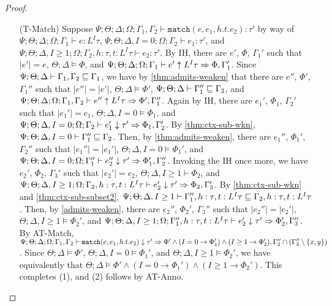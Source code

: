 \begin{proof}
\begin{itemize}
  
  \item[(T-Match)] Suppose
  $\Psi ; \Theta ; \Delta ; \Omega ; \Gamma_1,\Gamma_2\vdash \texttt{match}(e,e_1,h.t.e_2) : \tau'$ by way of
  $\Psi ; \Theta ; \Delta ; \Omega ; \Gamma_1\vdash e : L^I \tau$,
  $\Psi ; \Theta ; \Delta, I = 0 ; \Omega ; \Gamma_2\vdash e_1 : \tau'$, and
  $\Psi ; \Theta ; \Delta, I \geq 1; \Omega ; \Gamma_2, h : \tau, t : L^I \tau \vdash e_2 : \tau'$.
  By IH, there are $e'$, $\Phi$, $\Gamma_1'$ such that
  $|e'| = e$,
  $\Theta ; \Delta \vDash \Phi$, and
  $\Psi ; \Theta ; \Delta ; \Omega ; \Gamma_1 \vdash e' \uparrow L^I \tau \Rightarrow \Phi, \Gamma_1'$.
  Since $\Psi ; \Theta ; \Delta \vdash \Gamma_1,\Gamma_2 \sqsubseteq \Gamma_1$,
  we have by \autoref{thm:admits-weaken} that there are $e''$, $\Phi'$, $\Gamma_1''$ such that
  $|e''| = |e'|$,
  $\Theta ; \Delta \vDash \Phi'$,
  $\Psi ; \Theta ; \Delta \vdash \Gamma_1'' \sqsubseteq \Gamma_2$, and
  $\Psi ; \Theta ; \Delta ; \Omega ; \Gamma_1,\Gamma_2 \vdash e'' \uparrow L^I \tau \Rightarrow \Phi', \Gamma_1''$.
  Again by IH, there are $e_1'$, $\Phi_1$, $\Gamma_2'$ such that
  $|e_1'| = e_1$,
  $\Theta ; \Delta, I = 0 \vDash \Phi_1$, and
  $\Psi ; \Theta ; \Delta, I = 0 ; \Omega ; \Gamma_2 \vdash e_1' \downarrow \tau' \Rightarrow \Phi_1,\Gamma_2'$.
  By \autoref{thm:ctx-sub-wkn},
  $\Psi ; \Theta ; \Delta, I = 0 \vdash \Gamma_1'' \sqsubseteq \Gamma_2$.
  Then, by \autoref{thm:admits-weaken}, there are $e_1''$, $\Phi_1'$, $\Gamma_2''$ such that
  $|e_1''| = |e_1'|$,
  $\Theta ; \Delta, I = 0 \vDash \Phi_1'$, and
  $\Psi ; \Theta ; \Delta, I = 0 ; \Omega ; \Gamma_1'' \vdash e_2'' \downarrow \tau' \Rightarrow \Phi_1',\Gamma_2''$.
  Invoking the IH once more, we have $e_2'$, $\Phi_2$, $\Gamma_3'$ such that
  $|e_2'| = e_2$,
  $\Theta ; \Delta, I \geq 1 \vdash \Phi_2$, and
  $\Psi ; \Theta ; \Delta, I \geq 1 ; \Omega ; \Gamma_2, h : \tau, t : L^I \tau \vdash e_2' \downarrow \tau' \Rightarrow \Phi_2,\Gamma_3'$.
  By \autoref{thm:ctx-sub-wkn} and \autoref{thm:ctx-sub-subset2},
  $\Psi ; \Theta ; \Delta, I \geq 1 \vdash \Gamma_1'', h : \tau, t : L^I \tau \sqsubseteq \Gamma_2, h : \tau, t : L^I \tau$.
  Then, by \autoref{admits-weaken}, there are $e_2''$, $\Phi_2'$, $\Gamma_3''$ such that
  $|e_2''| = |e_2'|$,
  $\Theta ; \Delta, I \geq 1 \vDash \Phi_2'$, and
  $\Psi ; \Theta ; \Delta, I \geq 1; \Omega ; \Gamma_1'', h : \tau, t : L^I \tau \vdash e_2' \downarrow \tau' \Rightarrow \Phi_2',\Gamma_3''$.
  By AT-Match,
  $\Psi ; \Theta ; \Delta ; \Omega ; \Gamma_1,\Gamma_2\vdash \texttt{match}(e,e_1,h.t.e_2) \downarrow \tau' \Rightarrow \Phi' \wedge (I = 0 \to \Phi_1') \wedge (I \geq 1 \to \Phi_2'), \Gamma_2'' \cap (\Gamma_3'' \setminus \{x,y\})$.
  Since $\Theta ; \Delta \vDash \Phi'$,  $\Theta ; \Delta, I = 0 \vDash \Phi_1'$, and $\Theta ; \Delta, I \geq 1 \vDash \Phi_2'$, we have equivalently that
  $\Theta ; \Delta \vDash \Phi' \wedge (I = 0 \to \Phi_1') \wedge (I \geq 1 \to \Phi_2')$. This completes (1), and (2) follows by AT-Anno.
  

\end{itemize}
\end{proof}
